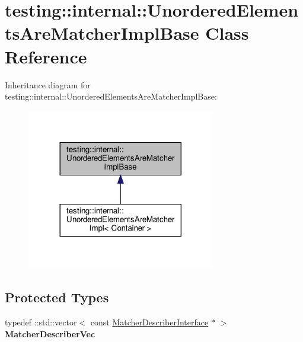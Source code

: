 \hypertarget{classtesting_1_1internal_1_1_unordered_elements_are_matcher_impl_base}{}\section{testing\+:\+:internal\+:\+:Unordered\+Elements\+Are\+Matcher\+Impl\+Base Class Reference}
\label{classtesting_1_1internal_1_1_unordered_elements_are_matcher_impl_base}


Inheritance diagram for testing\+:\+:internal\+:\+:Unordered\+Elements\+Are\+Matcher\+Impl\+Base\+:
\nopagebreak
\begin{figure}[H]
\begin{center}
\leavevmode
\includegraphics[width=233pt]{classtesting_1_1internal_1_1_unordered_elements_are_matcher_impl_base__inherit__graph}
\end{center}
\end{figure}
\subsection*{Protected Types}
\begin{DoxyCompactItemize}
\item 
\mbox{\label{classtesting_1_1internal_1_1_unordered_elements_are_matcher_impl_base_a81ca7ce793d4b25ce2a7d3e28b48cd64}} 
typedef \+::std\+::vector$<$ const \hyperlink{classtesting_1_1_matcher_describer_interface}{Matcher\+Describer\+Interface} $\ast$ $>$ {\bfseries Matcher\+Describer\+Vec}
\end{DoxyCompactItemize}
